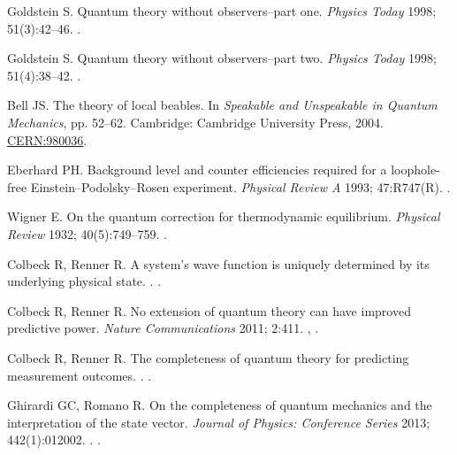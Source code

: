 \documentclass[DIV=calc,paper=a4,fontsize=11pt,twocolumn]{scrartcl} %
\theoremstyle{definition}
\theoremstyle{plain}
\begin{document}
\begin{thebibliography}{10}
Goldstein S.
\newblock Quantum theory without observers--part one.
\newblock \emph{Physics Today} 1998; 51(3):42--46.
\newblock \href {http://dx.doi.org/10.1063/1.882184}
{}.

Goldstein S.
\newblock Quantum theory without observers--part two.
\newblock \emph{Physics Today} 1998; 51(4):38--42.
\newblock \href {http://dx.doi.org/10.1063/1.882241}
{}.

Bell JS.
\newblock The theory of local beables.
\newblock In \emph{Speakable and Unspeakable in Quantum Mechanics}, pp.
52--62. Cambridge: Cambridge University Press, 2004.
\newblock \href{https://cds.cern.ch/record/980036}{CERN:980036}.

Eberhard PH.
\newblock Background level and counter efficiencies required for a loophole-free Einstein--Podolsky--Rosen experiment.
\newblock \emph{Physical Review A} 1993; 47:R747(R).
\newblock \href {http://dx.doi.org/10.1103/PhysRevA.47.R747}
{}.

Wigner E.
\newblock On the quantum correction for thermodynamic equilibrium.
\newblock \emph{Physical Review} 1932; 40(5):749--759.
\newblock \href {http://dx.doi.org/10.1103/PhysRev.40.749}
{}.

Colbeck R, Renner R.
\newblock A system's wave function is uniquely determined by its underlying physical state.
.
\newblock \href {http://arxiv.org/abs/1312.7353} {}.

Colbeck R, Renner R.
\newblock No extension of quantum theory can have improved predictive power.
\newblock \emph{Nature Communications} 2011; 2:411.
\newblock \href {http://arxiv.org/abs/1005.5173} {},
\href {http://dx.doi.org/10.1038/ncomms1416} {}.

Colbeck R, Renner R.
\newblock The completeness of quantum theory for predicting measurement outcomes.
.
\newblock \href {http://arxiv.org/abs/1208.4123} {}.

Ghirardi GC, Romano R.
\newblock On the completeness of quantum mechanics and the interpretation of
the state vector.
\newblock \emph{Journal of Physics: Conference Series} 2013; 442(1):012002.
.
\newblock \href {http://dx.doi.org/10.1088/1742-6596/442/1/012002}
{}.


\end{thebibliography}
\end{document}
